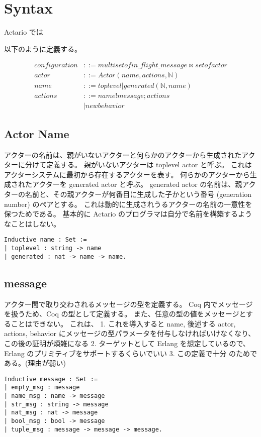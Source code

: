 \section{Syntax}

Actario では

以下のように定義する。

\begin{align*}
  configuration & ::= multiset of in\_flight\_message \bowtie set of actor \\
  actor & ::= Actor(name, actions, \mathbb{N}) \\
  name & ::= toplevel | generated(\mathbb{N}, name) \\
  actions & ::= name ! message; actions \\
  & \mid new behavior
\end{align*}


\subsection{Actor Name}
アクターの名前は、親がいないアクターと何らかのアクターから生成されたアクターに分けて定義する。
親がいないアクターは toplevel actor と呼ぶ。
これはアクターシステムに最初から存在するアクターを表す。
何らかのアクターから生成されたアクターを generated actor と呼ぶ。
generated actor の名前は、親アクターの名前と、その親アクターが何番目に生成した子かという番号 (generation number) のペアとする。
これは動的に生成されうるアクターの名前の一意性を保つためである。
基本的に Actario のプログラマは自分で名前を構築するようなことはしない。

\begin{lstlisting}
Inductive name : Set :=
| toplevel : string -> name
| generated : nat -> name -> name.
\end{lstlisting}

\subsection{message}
アクター間で取り交わされるメッセージの型を定義する。
Coq 内でメッセージを扱うため、Coq の型として定義する。
また、任意の型の値をメッセージとすることはできない。
これは、
1. これを導入すると name, 後述する actor, actions, behavior にメッセージの型パラメータを付与しなければいけなくなり、この後の証明が煩雑になる
2. ターゲットとして Erlang を想定しているので、Erlang のプリミティブをサポートするくらいでいい
3. この定義で十分
のためである。(理由が弱い)

\begin{lstlisting}
Inductive message : Set :=
| empty_msg : message
| name_msg : name -> message
| str_msg : string -> message
| nat_msg : nat -> message
| bool_msg : bool -> message
| tuple_msg : message -> message -> message.
\end{lstlisting}

